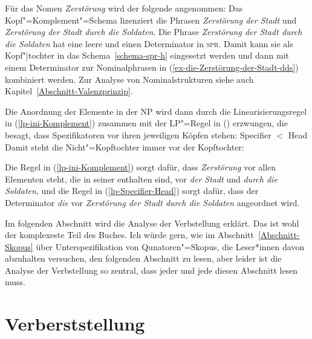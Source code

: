 \noindent
Für das Nomen \emph{Zerstörung} wird der folgende \catw angenommen:
\ea
{}
\z
Das Kopf"=Komplement"=Schema lizenziert die Phrasen  \emph{Zerstörung der Stadt}
und  \emph{Zerstörung der Stadt durch die Soldaten}. Die Phrase  \emph{Zerstörung der Stadt durch
  die Soldaten} hat eine leere \compsl und einen Determinator in \textsc{spr}. Damit kann sie als
Kopf"|tochter in das Schema~\ref{schema-spr-h} eingesetzt werden und dann mit einem Determinator zur
Nominalphrasen in (\ref{ex-die-Zerstörung-der-Stadt-dds}) kombiniert werden. Zur Analyse von
Nominalstrukturen siehe auch Kapitel~\ref{Abschnitt-Valenzprinzip}.

Die Anordnung der Elemente in der NP wird dann durch die Linearisierungsregel in (\ref{lp-ini-Komplement})
zusammen mit der LP"=Regel in () erzwungen, die besagt, dass Spezifikatoren vor ihren
jeweiligen Köpfen stehen:
\ea
\label{lp-Specifier-Head}
Specifier $<$ Head
\z
Damit steht die Nicht"=Kopftochter immer vor der Kopftochter:
\ea
{}
\z

Die Regel in (\ref{lp-ini-Komplement}) sorgt dafür, dass \emph{Zerstörung} vor allen Elementen steht, die in seiner
\compsl enthalten sind, \dash vor \emph{der Stadt} und \emph{durch die Soldaten}, und die Regel in
(\ref{lp-Specifier-Head}) sorgt dafür, dass der Determinator \emph{die} vor \emph{Zerstörung der Stadt durch die
Soldaten} angeordnet wird.

Im folgenden Abschnitt wird die Analyse der Verbstellung erklärt. Das ist wohl der komplexeste Teil
des Buches. Ich würde gern, wie im Abschnitt~\ref{Abschnitt-Skopus} über Unterspezifikation von Qunatoren"=Skopus, die
Leser*innen davon abzuhalten versuchen, den folgenden Abschnitt zu lesen, aber leider ist die
Analyse der Verbstellung so zentral, dass jeder und jede diesen Abschnitt lesen muss.

\section{Verberststellung}
\label{sec-v1}\label{Abschnitt-V1}

